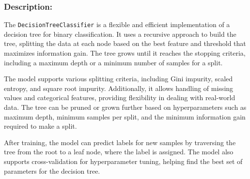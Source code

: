 \documentclass{article}
\begin{document}
\subsubsection*{Description:}
The \texttt{DecisionTreeClassifier} is a flexible and efficient implementation of a decision tree for binary classification. It uses a recursive approach to build the tree, splitting the data at each node based on the best feature and threshold that maximizes information gain. The tree grows until it reaches the stopping criteria, including a maximum depth or a minimum number of samples for a split.

The model supports various splitting criteria, including Gini impurity, scaled entropy, and square root impurity. Additionally, it allows handling of missing values and categorical features, providing flexibility in dealing with real-world data. The tree can be pruned or grown further based on hyperparameters such as maximum depth, minimum samples per split, and the minimum information gain required to make a split.

After training, the model can predict labels for new samples by traversing the tree from the root to a leaf node, where the label is assigned. The model also supports cross-validation for hyperparameter tuning, helping find the best set of parameters for the decision tree.
\end{document}
